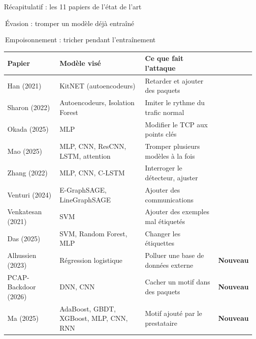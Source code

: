 \documentclass[aspectratio=169,11pt,xcolor=table]{beamer}
\newcommand{\famille}[2]{\colorbox{#1}{\strut\,#2\,}}
\newcommand{\nouveau}{\textbf{\color{projectteal}Nouveau}}
\begin{document}
\begin{frame}{Récapitulatif : les 11 papiers de l'état de l'art}
  \footnotesize
  \famille{evasion}{Évasion : tromper un modèle déjà entraîné}
  \quad
  \famille{empoisonnement}{Empoisonnement : tricher pendant l'entraînement}
  \vspace{.5em}

  \scriptsize
  \renewcommand{\arraystretch}{1.2}
  \begin{tabularx}{\linewidth}{@{}>{\raggedright\arraybackslash}p{.2\linewidth}>{\raggedright\arraybackslash}p{.34\linewidth}>{\raggedright\arraybackslash}X>{\raggedright\arraybackslash}p{.08\linewidth}@{}}
    \toprule
    \textbf{Papier} & \textbf{Modèle visé} & \textbf{Ce que fait l'attaque} & \\
    \midrule
    \rowcolor{evasion} Han (2021) & KitNET (autoencodeurs) & Retarder et ajouter des paquets & \\
    \rowcolor{evasion} Sharon (2022) & Autoencodeurs, Isolation Forest & Imiter le rythme du trafic normal & \\
    \rowcolor{evasion} Okada (2025) & MLP & Modifier le TCP aux points clés & \\
    \rowcolor{evasion} Mao (2025) & MLP, CNN, ResCNN, LSTM, attention & Tromper plusieurs modèles à la fois & \\
    \rowcolor{evasion} Zhang (2022) & MLP, CNN, C-LSTM & Interroger le détecteur, ajuster & \\
    \rowcolor{evasion} Venturi (2024) & E-GraphSAGE, LineGraphSAGE & Ajouter des communications & \\
    \rowcolor{empoisonnement} Venkatesan (2021) & SVM & Ajouter des exemples mal étiquetés & \\
    \rowcolor{empoisonnement} Das (2025) & SVM, Random Forest, MLP & Changer les étiquettes & \\
    \rowcolor{empoisonnement} Alhussien (2023) & Régression logistique & Polluer une base de données externe & \nouveau \\
    \rowcolor{empoisonnement} PCAP-Backdoor (2026) & DNN, CNN & Cacher un motif dans des paquets & \nouveau \\
    \rowcolor{empoisonnement} Ma (2025) & AdaBoost, GBDT, XGBoost, MLP, CNN, RNN & Motif ajouté par le prestataire & \nouveau \\
    \bottomrule
  \end{tabularx}
\end{frame}
\end{document}
